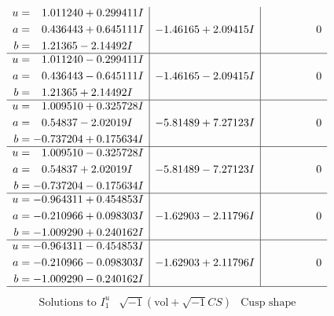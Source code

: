 \documentclass[1p]{elsarticle_modified}
\theoremstyle{definition}
\newcommand{\I}{\sqrt{-1}}
\begin{document}
$$\begin{array}{c|c|c}
\begin{aligned}
u &= \phantom{-}1.011240 + 0.299411 I \\
a &= \phantom{-}0.436443 + 0.645111 I \\
b &= \phantom{-}1.21365 - 2.14492 I\end{aligned}
 & -1.46165 + 2.09415 I & \phantom{-0.000000 } 0 \\ \hline\begin{aligned}
u &= \phantom{-}1.011240 - 0.299411 I \\
a &= \phantom{-}0.436443 - 0.645111 I \\
b &= \phantom{-}1.21365 + 2.14492 I\end{aligned}
 & -1.46165 - 2.09415 I & \phantom{-0.000000 } 0 \\ \hline\begin{aligned}
u &= \phantom{-}1.009510 + 0.325728 I \\
a &= \phantom{-}0.54837 - 2.02019 I \\
b &= -0.737204 + 0.175634 I\end{aligned}
 & -5.81489 + 7.27123 I & \phantom{-0.000000 } 0 \\ \hline\begin{aligned}
u &= \phantom{-}1.009510 - 0.325728 I \\
a &= \phantom{-}0.54837 + 2.02019 I \\
b &= -0.737204 - 0.175634 I\end{aligned}
 & -5.81489 - 7.27123 I & \phantom{-0.000000 } 0 \\ \hline\begin{aligned}
u &= -0.964311 + 0.454853 I \\
a &= -0.210966 + 0.098303 I \\
b &= -1.009290 + 0.240162 I\end{aligned}
 & -1.62903 - 2.11796 I & \phantom{-0.000000 } 0 \\ \hline\begin{aligned}
u &= -0.964311 - 0.454853 I \\
a &= -0.210966 - 0.098303 I \\
b &= -1.009290 - 0.240162 I\end{aligned}
 & -1.62903 + 2.11796 I & \phantom{-0.000000 } 0\\
 \hline 
 \end{array}$$\newpage$$\begin{array}{c|c|c}  
\text{Solutions to }I^u_{1}& \I (\text{vol} + \sqrt{-1}CS) & \text{Cusp shape}\\
 \hline 
\begin{aligned}

\end{aligned}
\end{array}$$
\end{document}
